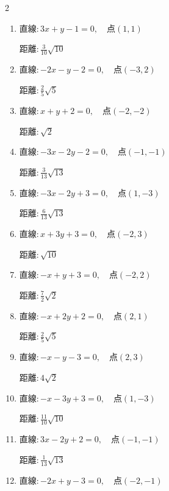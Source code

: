 \begin{multicols}{2}
\begin{enumerate}
        $\displaystyle 距離 : \frac{1}{5}\sqrt{5}$

  \item $直線:3x+y-1=0,\quad 点 ( 1, 1 )$

        $\displaystyle 距離 : \frac{3}{10}\sqrt{10}$

  \item $直線:-2x-y-2=0,\quad 点 ( -3, 2 )$

        $\displaystyle 距離 : \frac{2}{5}\sqrt{5}$

  \item $直線:x+y+2=0,\quad 点 ( -2, -2 )$

        $\displaystyle 距離 : \sqrt{2}$

  \item $直線:-3x-2y-2=0,\quad 点 ( -1, -1 )$

        $\displaystyle 距離 : \frac{3}{13}\sqrt{13}$

  \item $直線:-3x-2y+3=0,\quad 点 ( 1, -3 )$

        $\displaystyle 距離 : \frac{6}{13}\sqrt{13}$

\columnbreak %

  \item $直線:x+3y+3=0,\quad 点 ( -2, 3 )$

        $\displaystyle 距離 : \sqrt{10}$

  \item $直線:-x+y+3=0,\quad 点 ( -2, 2 )$

        $\displaystyle 距離 : \frac{7}{2}\sqrt{2}$

  \item $直線:-x+2y+2=0,\quad 点 ( 2, 1 )$

        $\displaystyle 距離 : \frac{2}{5}\sqrt{5}$

  \item $直線:-x-y-3=0,\quad 点 ( 2, 3 )$

        $\displaystyle 距離 : 4\sqrt{2}$

  \item $直線:-x-3y+3=0,\quad 点 ( 1, -3 )$

        $\displaystyle 距離 : \frac{11}{10}\sqrt{10}$

  \item $直線:3x-2y+2=0,\quad 点 ( -1, -1 )$

        $\displaystyle 距離 : \frac{1}{13}\sqrt{13}$

  \item $直線:-2x+y-3=0,\quad 点 ( -2, -1 )$


\end{enumerate}
\end{multicols}
